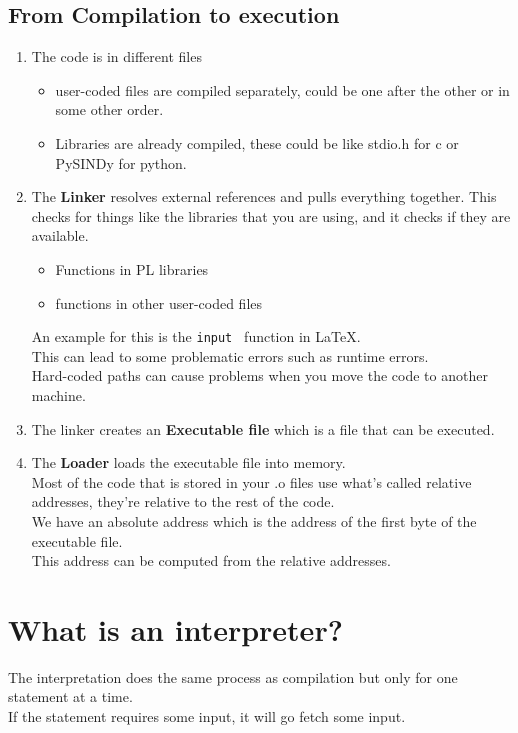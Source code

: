     \subsection{From Compilation to execution}
    \begin{enumerate}
        \item The code is in different files
            \begin{itemize}
                \item user-coded files are compiled separately, could be one after the other or in some other order.
                \item Libraries are already compiled, these could be like stdio.h for c or PySINDy for python.
            \end{itemize}
        \item The \textbf{Linker} resolves external references and pulls everything together. This checks for things like the libraries that you are using, and it checks if they are available.\\
            \begin{itemize}
                \item Functions in PL libraries
                \item functions in other user-coded files
            \end{itemize}
            An example for this is the \texttt{input } function in \LaTeX.\\
            This can lead to some problematic errors such as runtime errors.\\
            Hard-coded paths can cause problems when you move the code to another machine.\\
        \item The linker creates an \textbf{Executable file} which is a file that can be executed.\\
        \item The \textbf{Loader} loads the executable file into memory.\\
        Most of the code that is stored in your .o files use what's called relative addresses, they're relative to the rest of the code.\\
        We have an absolute address which is the address of the first byte of the executable file.\\
        This address can be computed from the relative addresses.\\
    \end{enumerate}
     
     
    \section{What is an interpreter?}
    The interpretation does the same process as compilation but only for one statement at a time.\\
    If the statement requires some input, it will go fetch some input.\\